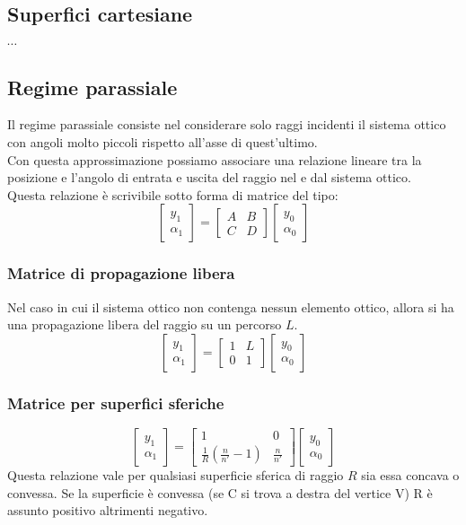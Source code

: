 \documentclass{article}
\begin{document}
\subsection*{Superfici cartesiane}
$\cdots$

\subsection*{Regime parassiale}
Il regime parassiale consiste nel considerare solo raggi incidenti il sistema ottico con angoli molto piccoli rispetto all'asse di quest'ultimo.\\
Con questa approssimazione possiamo associare una relazione lineare tra la posizione e l'angolo di entrata e uscita del raggio nel e dal sistema ottico.\\
Questa relazione è scrivibile sotto forma di matrice del tipo:
\[
\begin{bmatrix}
y_1\\
\alpha_1
\end{bmatrix}
=
\begin{bmatrix}
A	&	B\\
C	&	D
\end{bmatrix}
\begin{bmatrix}
y_0\\
\alpha_0
\end{bmatrix}
\]

\subsubsection*{Matrice di propagazione libera}
Nel caso in cui il sistema ottico non contenga nessun elemento ottico, allora si ha una propagazione libera del raggio su un percorso $L$.
\[
\begin{bmatrix}
y_1\\
\alpha_1
\end{bmatrix}
=
\begin{bmatrix}
1	&	L\\
0	&	1
\end{bmatrix}
\begin{bmatrix}
y_0\\
\alpha_0
\end{bmatrix}
\]

\subsubsection*{Matrice per superfici sferiche}
\[
\begin{bmatrix}
y_1\\
\alpha_1
\end{bmatrix}
=
\begin{bmatrix}
1	&	0\\
\frac{1}{R}(\frac{n}{n'}-1)	&	\frac{n}{n'}
\end{bmatrix}
\begin{bmatrix}
y_0\\
\alpha_0
\end{bmatrix}
\]
Questa relazione vale per qualsiasi superficie sferica di raggio $R$ sia essa concava o convessa. Se la superficie è convessa (se C si trova a destra del vertice V) R è assunto positivo altrimenti negativo.
\end{document}
